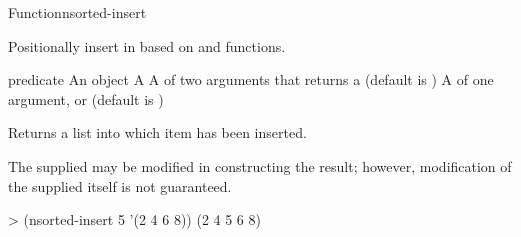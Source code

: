 \documentclass[10pt,twoside,english,pdftex]{article}
\begin{document}
\begin{functiondoc}{Function}{nsorted-insert}{
      \returns{} } 
%
%
  
\fnsyntax

\fnpurpose Positionally insert  in  based on
 and  functions.

\fnpackage {}

\fnmodule {}

\fnargs
\begin{args}{predicate}
\arg[item] An object
\arg[list] A 
\arg[predicate] A  of two arguments that returns a
 (default is )
\arg[key] A  of one argument, or \nil{} (default is \nil)
\end{args}

\fnreturns Returns a list into which item has been inserted.

\fndescription The supplied  may be modified in
constructing the result; however, modification of the supplied
 itself is not guaranteed.

\fnexample
\begin{example}
> (nsorted-insert 5 '(2 4 6 8))
(2 4 5 6 8)
\end{example}

\end{functiondoc}

\end{document}
